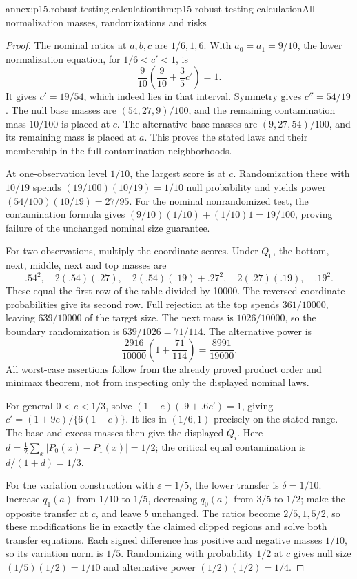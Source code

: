 \begin{annexitem}{annex:p15.robust.testing.calculation}{thm:p15-robust-testing-calculation}{All normalization masses, randomizations and risks}
\begin{proof}
The nominal ratios at \(a,b,c\) are \(1/6,1,6\).
With \(a_0=a_1=9/10\), the lower normalization equation, for
\(1/6<c'<1\), is
\[
 \frac9{10}\left(\frac9{10}+\frac35c'\right)=1.
\]
It gives \(c'=19/54\), which indeed lies in that interval.
Symmetry gives \(c''=54/19\).
The null base masses are \((54,27,9)/100\), and the remaining
contamination mass \(10/100\) is placed at \(c\).
The alternative base masses are \((9,27,54)/100\), and its remaining
mass is placed at \(a\). This proves the stated laws and their
membership in the full contamination neighborhoods.

At one-observation level \(1/10\), the largest score is at \(c\).
Randomization there with \(10/19\) spends
\((19/100)(10/19)=1/10\) null probability and yields power
\((54/100)(10/19)=27/95\).
For the nominal nonrandomized test, the contamination formula gives
\((9/10)(1/10)+(1/10)1=19/100\), proving failure of the unchanged
nominal size guarantee.

For two observations, multiply the coordinate scores.
Under \(Q_0\), the bottom, next, middle, next and top masses are
\[
 .54^2,\quad2(.54)(.27),\quad2(.54)(.19)+.27^2,\quad
 2(.27)(.19),\quad .19^2 .
\]
These equal the first row of the table divided by 10000.
The reversed coordinate probabilities give its second row.
Full rejection at the top spends \(361/10000\), leaving
\(639/10000\) of the target size. The next mass is \(1026/10000\),
so the boundary randomization is \(639/1026=71/114\).
The alternative power is
\[
 \frac{2916}{10000}\left(1+\frac{71}{114}\right)
 =\frac{8991}{19000}.
\]
All worst-case assertions follow from the already proved product
order and minimax theorem, not from inspecting only the displayed
nominal laws.

For general \(0<e<1/3\), solve
\((1-e)(.9+.6c')=1\), giving
\(c'=(1+9e)/\{6(1-e)\}\).
It lies in \((1/6,1)\) precisely on the stated range.
The base and excess masses then give the displayed \(Q_i\).
Here \(d=\tfrac12\sum_x|P_0(x)-P_1(x)|=1/2\);
the critical equal contamination is \(d/(1+d)=1/3\).

For the variation construction with \(\varepsilon=1/5\), the lower
transfer is \(\delta=1/10\). Increase \(q_1(a)\) from \(1/10\)
to \(1/5\), decreasing \(q_0(a)\) from \(3/5\) to \(1/2\);
make the opposite transfer at \(c\), and leave \(b\) unchanged.
The ratios become \(2/5,1,5/2\), so these modifications lie in exactly
the claimed clipped regions and solve both transfer equations.
Each signed difference has positive and negative masses \(1/10\),
so its variation norm is \(1/5\).
Randomizing with probability \(1/2\) at \(c\) gives null size
\((1/5)(1/2)=1/10\) and alternative power \((1/2)(1/2)=1/4\).


\end{proof}
\end{annexitem}

